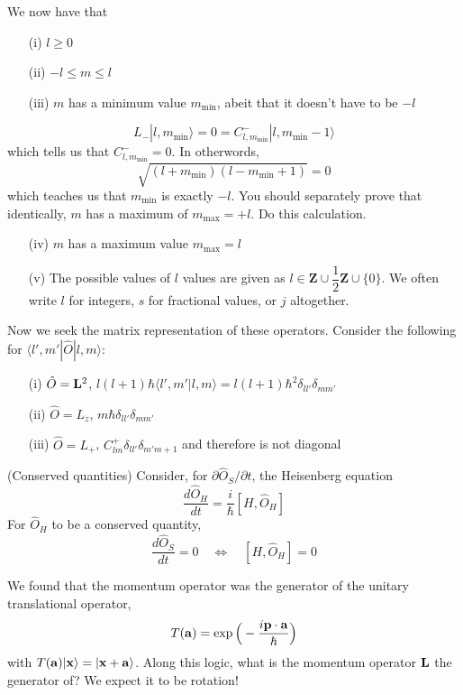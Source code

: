 \begin{cor}
We now have that
\begin{itemize}
\item[(i)] $l\geq 0$ 
\item[(ii)] $-l\leq m\leq l$
\item[(iii)] $m$ has a minimum value $m_{\mathrm{min}}$, abeit that it doesn't have to be $-l$
\end{itemize}
\[L_{-}|l,m_{\mathrm{min}}\rangle =0=C^{-}_{l,m_{\mathrm{min}}}|l,m_{\mathrm{min}}-1\rangle \]
which tells us that $C^{-}_{l,m_{\mathrm{min}}} =0$. In otherwords,
\[\sqrt{(l+m_{\mathrm{min}})(l-m_{\mathrm{min}}+1)}=0\]
which teaches us that $m_{\mathrm{min}}$ is exactly $-l$. You should separately prove that identically, $m$ has a maximum of $m_{\mathrm{max}}=+l$. Do this calculation.
\begin{itemize}
\item[(iv)] $m$ has a maximum value $m_{\mathrm{max}}=l$
\item[(v)] The possible values of $l$ values are given as $l\in {\bm Z}\cup \dfrac{1}{2}{\bm Z}\cup \{0\}$. We often write $l$ for integers, $s$ for fractional values, or $j$ altogether.
\end{itemize}
\end{cor}
\vspace{2ex}
\begin{thm}
Now we seek the matrix representation of these operators. Consider the following for $\langle l',m'|\hat{O}|l,m\rangle $:
\begin{itemize}
\item[(i)] $\hat{O}={\bf L}^2$, $l(l+1)\hbar \langle l',m'|l,m\rangle =l(l+1)\hbar ^2\delta _{ll'}\delta _{mm'}$
\item[(ii)] $\hat{O}=L_{z}$, $m\hbar \delta _{ll'}\delta _{m m'}$
\item[(iii)] $\hat{O}=L_{+}$, $C^{+}_{lm}\delta _{ll'}\delta _{m'm+1}$ and therefore is not diagonal
\end{itemize}
\end{thm}
\vspace{2ex}
\begin{defi}
(Conserved quantities) Consider, for $\partial \hat{O}_{S}/\partial t$, the Heisenberg equation
\[\dfrac{d \hat{O}_{H}}{d t}=\dfrac{i}{\hbar }[H,\hat{O}_{H}] \]
For $\hat{O}_{H}$ to be a conserved quantity,
\[\dfrac{d \hat{O}_{S}}{d t}=0\quad \iff\quad [H,\hat{O}_{H}]=0 \]
\end{defi}
\vspace{2ex}
\begin{thm}
We found that the momentum operator was the generator of the unitary translational operator,
\[T({\bf a})=\exp \Big(-\dfrac{i{\bf p}\cdot {\bf a}}{\hbar }\Big)\]
with $T({\bf a})|{\bf x}\rangle =|{\bf x}+{\bf a}\rangle $. Along this logic, what is the momentum operator ${\bf L}$ the generator of? We expect it to be rotation!
\end{thm}
